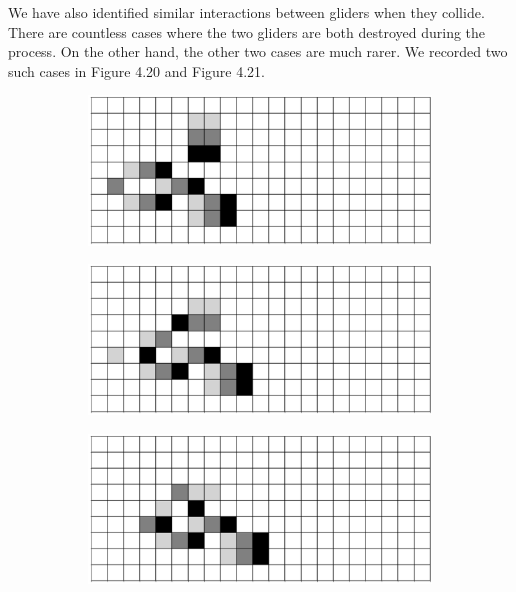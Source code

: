 \documentclass[12pt]{article}
\numberwithin{figure}{section} %
\begin{document}
We have also identified similar interactions between gliders when they collide. There are countless cases where the two gliders are both destroyed during the process. On the other hand, the other two cases are much rarer. We recorded two such cases in Figure 4.20 and Figure 4.21. 

\begin{figure}[H]
	\begin{subfigure}{0.45\textwidth}
     	\includegraphics[width=\linewidth]{Section4/35.0}
     	\subcaption{}
   	\end{subfigure}
    	\begin{subfigure}{0.45\textwidth}
     	\includegraphics[width=\linewidth]{Section4/35.1}
     	\subcaption{}
   	\end{subfigure}
	\newline
	\begin{subfigure}{0.45\textwidth}
     	\includegraphics[width=\linewidth]{Section4/35.2}

\end{subfigure}
\end{figure}
\end{document}
